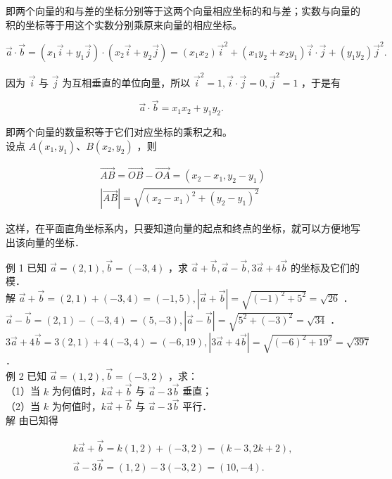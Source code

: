 \documentclass[10pt]{article}
\begin{document}
即两个向量的和与差的坐标分别等于这两个向量相应坐标的和与差；实数与向量的积的坐标等于用这个实数分别乘原来向量的相应坐标。

\[
\vec{a} \cdot \vec{b}=\left(x_{1} \vec{i}+y_{1} \vec{j}\right) \cdot\left(x_{2} \vec{i}+y_{2} \vec{j}\right)=\left(x_{1} x_{2}\right) \vec{i}^{2}+\left(x_{1} y_{2}+x_{2} y_{1}\right) \vec{i} \cdot \vec{j}+\left(y_{1} y_{2}\right) \vec{j}^{2} .
\]

因为 \(\vec{i}\) 与 \(\vec{j}\) 为互相垂直的单位向量，所以 \(\vec{i}^{2}=1, \vec{i} \cdot \vec{j}=0, \vec{j}^{2}=1\) ，于是有

\[
\vec{a} \cdot \vec{b}=x_{1} x_{2}+y_{1} y_{2} \text {. }
\]

即两个向量的数量积等于它们对应坐标的乘积之和。\\
设点 \(A\left(x_{1}, y_{1}\right) 、 B\left(x_{2}, y_{2}\right)\) ，则

\[
\begin{gathered}
\overrightarrow{A B}=\overrightarrow{O B}-\overrightarrow{O A}=\left(x_{2}-x_{1}, y_{2}-y_{1}\right) \\
|\overrightarrow{A B}|=\sqrt{\left(x_{2}-x_{1}\right)^{2}+\left(y_{2}-y_{1}\right)^{2}}
\end{gathered}
\]

这样，在平面直角坐标系内，只要知道向量的起点和终点的坐标，就可以方便地写出该向量的坐标．

例 1 已知 \(\vec{a}=(2,1), \vec{b}=(-3,4)\) ，求 \(\vec{a}+\vec{b}, \vec{a}-\vec{b}, 3 \vec{a}+4 \vec{b}\) 的坐标及它们的模．\\
解 \(\vec{a}+\vec{b}=(2,1)+(-3,4)=(-1,5),|\vec{a}+\vec{b}|=\sqrt{(-1)^{2}+5^{2}}=\sqrt{26}\) ．\\
\(\vec{a}-\vec{b}=(2,1)-(-3,4)=(5,-3),|\vec{a}-\vec{b}|=\sqrt{5^{2}+(-3)^{2}}=\sqrt{34}\) ．\\
\(3 \vec{a}+4 \vec{b}=3(2,1)+4(-3,4)=(-6,19),|3 \vec{a}+4 \vec{b}|=\sqrt{(-6)^{2}+19^{2}}=\sqrt{397}\) ．\\
例 2 已知 \(\vec{a}=(1,2), \vec{b}=(-3,2)\) ，求：\\
（1）当 \(k\) 为何值时，\(k \vec{a}+\vec{b}\) 与 \(\vec{a}-3 \vec{b}\) 垂直；\\
（2）当 \(k\) 为何值时，\(k \vec{a}+\vec{b}\) 与 \(\vec{a}-3 \vec{b}\) 平行．\\
解 由已知得

\[
\begin{gathered}
k \vec{a}+\vec{b}=k(1,2)+(-3,2)=(k-3,2 k+2), \\
\vec{a}-3 \vec{b}=(1,2)-3(-3,2)=(10,-4) .
\end{gathered}
\]
\end{document}
